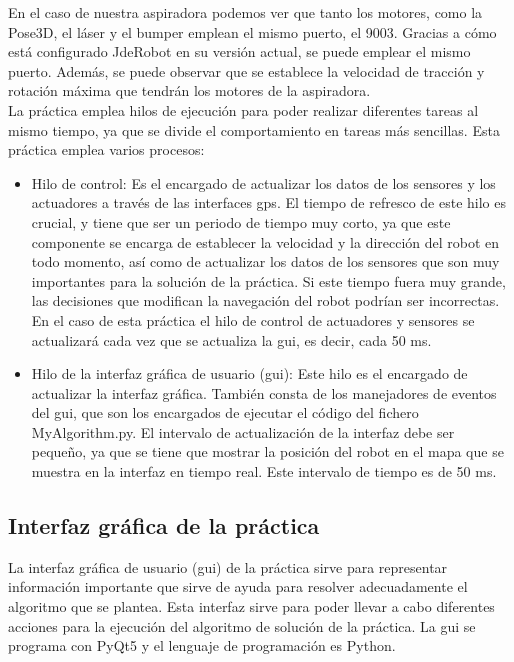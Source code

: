 En el caso de nuestra aspiradora podemos ver que tanto los motores, como la Pose3D, el láser y el bumper emplean el mismo puerto, el 9003. Gracias a cómo está configurado JdeRobot en su versión actual, se puede emplear el mismo puerto. Además, se puede observar que se establece la velocidad de tracción y rotación máxima que tendrán los motores de la aspiradora.\\

La práctica emplea hilos de ejecución para poder realizar diferentes tareas al mismo tiempo, ya que se divide el comportamiento en tareas más sencillas. Esta práctica emplea varios procesos:

\begin{itemize}
\item Hilo de control: Es el encargado de actualizar los datos de los sensores y los actuadores a través de las interfaces \acrshort{gps}. El tiempo de refresco de este hilo es crucial, y tiene que ser un periodo de tiempo muy corto, ya que este componente se encarga de establecer la velocidad y la dirección del robot en todo momento, así como de actualizar los datos de los sensores que son muy importantes para la solución de la práctica. Si este tiempo fuera muy grande, las decisiones que modifican la navegación del robot podrían ser incorrectas. En el caso de esta práctica el hilo de control de actuadores y sensores se actualizará cada vez que se actualiza la \acrshort{gui}, es decir, cada 50 ms.

\item	Hilo de la interfaz gráfica de usuario (\acrshort{gui}): Este hilo es el encargado de actualizar la interfaz gráfica. También consta de los manejadores de eventos del \acrshort{gui}, que son los encargados de ejecutar el código del fichero MyAlgorithm.py. El intervalo de actualización de la interfaz debe ser pequeño, ya que se tiene que mostrar la posición del robot en el mapa que se muestra en la interfaz en tiempo real. Este intervalo de tiempo es de 50 ms.

\end{itemize}


\subsection{Interfaz gráfica de la práctica}
La interfaz gráfica de usuario (\acrshort{gui}) de la práctica sirve para representar información importante que sirve de ayuda para resolver adecuadamente el algoritmo que se plantea. Esta interfaz sirve para poder llevar a cabo diferentes acciones para la ejecución del algoritmo de solución de la práctica. La \acrshort{gui} se programa con PyQt5 y el lenguaje de programación es Python.\\

